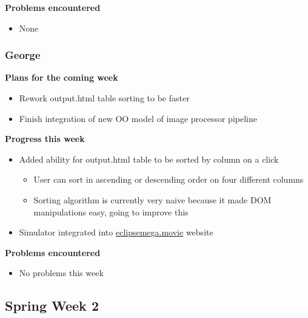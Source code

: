 \documentclass[10pt, onecolumn, draftclsnofoot, letterpaper, compsoc]{IEEEtran}
\begin{document}
    \noindent \textbf{Problems encountered}

    \begin{itemize}

    \item None

    \end{itemize}

    \subsubsection{George}

    \noindent \textbf{Plans for the coming week}

    \begin{itemize}

    \item Rework output.html table sorting to be faster
    \item Finish integration of new OO model of image processor pipeline

    \end{itemize}

    \noindent \textbf{Progress this week}

    \begin{itemize}

    \item Added ability for output.html table to be sorted by column on a click
    \begin{itemize}
      \item User can sort in ascending or descending order on four different columns
      \item Sorting algorithm is currently very naive because it made DOM manipulations easy, going to improve this
    \end{itemize}

    \item Simulator integrated into \href{https://eclipsemega.movie}{eclipsemega.movie} website

    \end{itemize}

    \noindent \textbf{Problems encountered}

    \begin{itemize}

    \item No problems this week

    \end{itemize}

\subsection{Spring Week 2}
\end{document}
